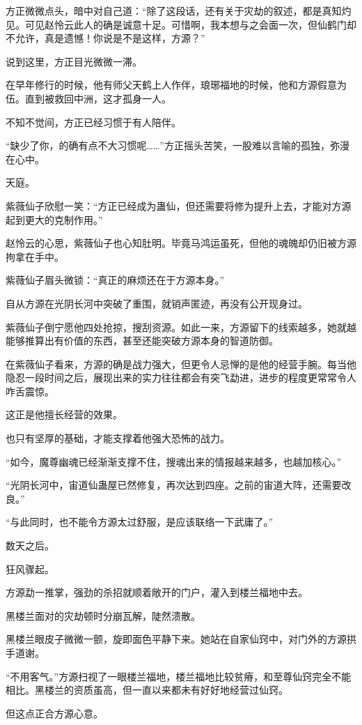 \begin{this_body}
方正微微点头，暗中对自己道：“除了这段话，还有关于灾劫的叙述，都是真知灼见。可见赵怜云此人的确是诚意十足。可惜啊，我本想与之会面一次，但仙鹤门却不允许，真是遗憾！你说是不是这样，方源？”

说到这里，方正目光微微一滞。

在早年修行的时候，他有师父天鹤上人作伴，琅琊福地的时候，他和方源假意为伍。直到被救回中洲，这才孤身一人。

不知不觉间，方正已经习惯于有人陪伴。

“缺少了你，的确有点不大习惯呢……”方正摇头苦笑，一股难以言喻的孤独，弥漫在心中。

天庭。

紫薇仙子欣慰一笑：“方正已经成为蛊仙，但还需要将修为提升上去，才能对方源起到更大的克制作用。”

赵怜云的心思，紫薇仙子也心知肚明。毕竟马鸿运虽死，但他的魂魄却仍旧被方源拘拿在手中。

紫薇仙子眉头微锁：“真正的麻烦还在于方源本身。”

自从方源在光阴长河中突破了重围，就销声匿迹，再没有公开现身过。

紫薇仙子倒宁愿他四处抢掠，搜刮资源。如此一来，方源留下的线索越多，她就越能够推算出有价值的东西，甚至还能突破方源本身的智道防御。

在紫薇仙子看来，方源的确是战力强大，但更令人忌惮的是他的经营手腕。每当他隐忍一段时间之后，展现出来的实力往往都会有突飞勐进，进步的程度更常常令人咋舌震惊。

这正是他擅长经营的效果。

也只有坚厚的基础，才能支撑着他强大恐怖的战力。

“如今，魔尊幽魂已经渐渐支撑不住，搜魂出来的情报越来越多，也越加核心。”

“光阴长河中，宙道仙蛊屋已然修复，再次达到四座。之前的宙道大阵，还需要改良。”

“与此同时，也不能令方源太过舒服，是应该联络一下武庸了。”

数天之后。

狂风骤起。

方源勐一推掌，强劲的杀招就顺着敞开的门户，灌入到楼兰福地中去。

黑楼兰面对的灾劫顿时分崩瓦解，陡然溃散。

黑楼兰眼皮子微微一颤，旋即面色平静下来。她站在自家仙窍中，对门外的方源拱手道谢。

“不用客气。”方源扫视了一眼楼兰福地，楼兰福地比较贫瘠，和至尊仙窍完全不能相比。黑楼兰的资质虽高，但一直以来都未有好好地经营过仙窍。

但这点正合方源心意。


\end{this_body}
